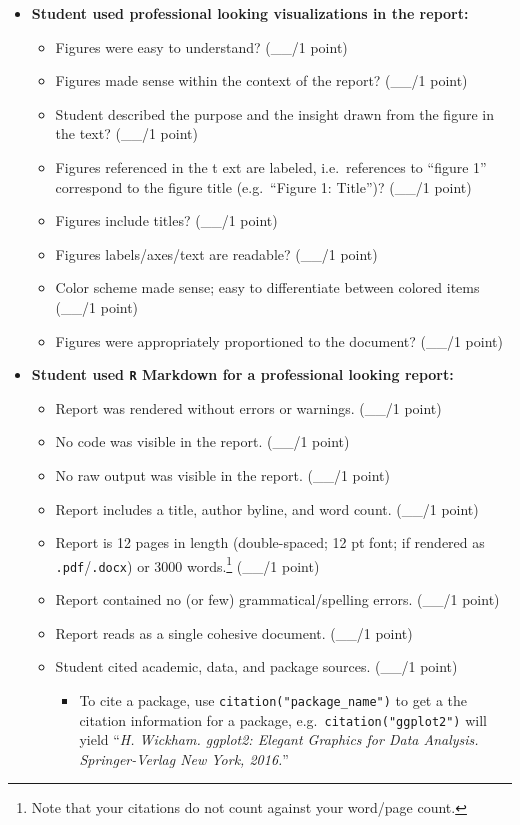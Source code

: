 \documentclass[
  11pt,
]{article}
\providecommand{\tightlist}{%
  \setlength{\itemsep}{0pt}\setlength{\parskip}{0pt}}
\begin{document}
\begin{itemize}
\tightlist
\item
  \textbf{Student used professional looking visualizations in the
  report:}

  \begin{itemize}
  \tightlist
  \item
    Figures were easy to understand? (\_\_/1 point)
  \item
    Figures made sense within the context of the report? (\_\_/1 point)
  \item
    Student described the purpose and the insight drawn from the figure
    in the text? (\_\_/1 point)
  \item
    Figures referenced in the t ext are labeled, i.e.~references to
    ``figure 1'' correspond to the figure title (e.g.~``Figure 1:
    Title'')? (\_\_/1 point)
  \item
    Figures include titles? (\_\_/1 point)
  \item
    Figures labels/axes/text are readable? (\_\_/1 point)
  \item
    Color scheme made sense; easy to differentiate between colored items
    (\_\_/1 point)
  \item
    Figures were appropriately proportioned to the document? (\_\_/1
    point)
  \end{itemize}
\item
  \textbf{Student used \texttt{R} Markdown for a professional looking
  report:}

  \begin{itemize}
  \tightlist
  \item
    Report was rendered without errors or warnings. (\_\_/1 point)
  \item
    No code was visible in the report. (\_\_/1 point)
  \item
    No raw output was visible in the report. (\_\_/1 point)
  \item
    Report includes a title, author byline, and word count. (\_\_/1
    point)
  \item
    Report is 12 pages in length (double-spaced; 12 pt font; if rendered
    as \texttt{.pdf}/\texttt{.docx}) or 3000 words.\footnote{Note that
      your citations do not count against your word/page count.} (\_\_/1
    point)
  \item
    Report contained no (or few) grammatical/spelling errors. (\_\_/1
    point)
  \item
    Report reads as a single cohesive document. (\_\_/1 point)
  \item
    Student cited academic, data, and package sources. (\_\_/1 point)

    \begin{itemize}
    \tightlist
    \item
      To cite a package, use \texttt{citation("package\_name")} to get a
      the citation information for a package,
      e.g.~\texttt{citation("ggplot2")} will yield ``\emph{H. Wickham.
      ggplot2: Elegant Graphics for Data Analysis. Springer-Verlag New
      York, 2016.}''
    \end{itemize}
  \end{itemize}
\end{itemize}
\end{document}
